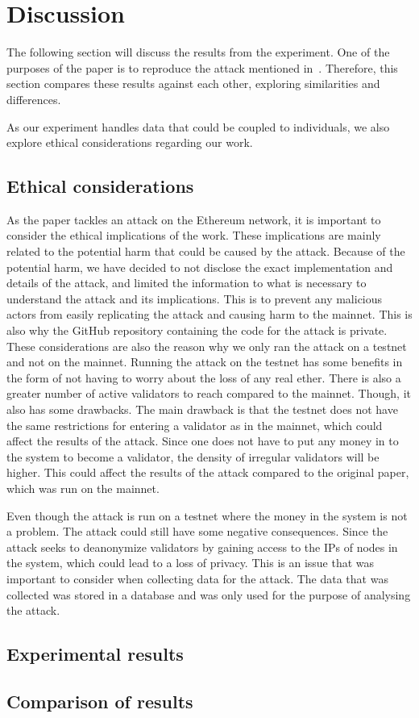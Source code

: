 

\section{Discussion}\label{sec:discussion}
The following section will discuss the results from the experiment.
One of the purposes of the paper is
to reproduce the attack mentioned in~\cite{heimbach2024deanonymizingethereumvalidatorsp2p}.
Therefore, this section compares these results against each other, exploring similarities and differences.


As our experiment handles data that could be coupled to individuals,
we also explore ethical considerations regarding our work.


\subsection{Ethical considerations}\label{subsec:ethical-considerations}
As the paper tackles an attack on the Ethereum network,
it is important to consider the ethical implications of the work.
These implications are mainly related to the potential harm that could be caused by the attack.
Because of the potential harm, we have decided to not disclose the exact implementation and details of the attack,
and limited the information to what is necessary to understand the attack and its implications.
This is to prevent any malicious actors from easily replicating the attack and causing harm to the mainnet.
This is also why the GitHub repository containing the code for the attack is private.
These considerations are also the reason why we only ran the attack on a testnet and not on the mainnet.
Running the attack on the testnet has some benefits in the form
of not having to worry about the loss of any real ether.
There is also a greater number of active validators to reach compared to the mainnet.
Though, it also has some drawbacks.
The main drawback is that the testnet does not have the same restrictions for entering a validator as in the mainnet,
which could affect the results of the attack.
Since one does not have to put any money in to the system to become a validator,
the density of irregular validators will be higher.
This could affect the results of the attack compared to the original paper, which was run on the mainnet.

Even though the attack is run on a testnet where the money in the system is not a problem.
The attack could still have some negative consequences.
Since the attack seeks to deanonymize validators by gaining access to the IPs of nodes in the system, which could lead to a loss of privacy.
This is an issue that was important to consider when collecting data for the attack.
The data that was collected was stored in a database and was only used for the purpose of analysing the attack.

\subsection{Experimental results}\label{subsec:expres}

\subsection{Comparison of results}\label{subsec:res-comparison}